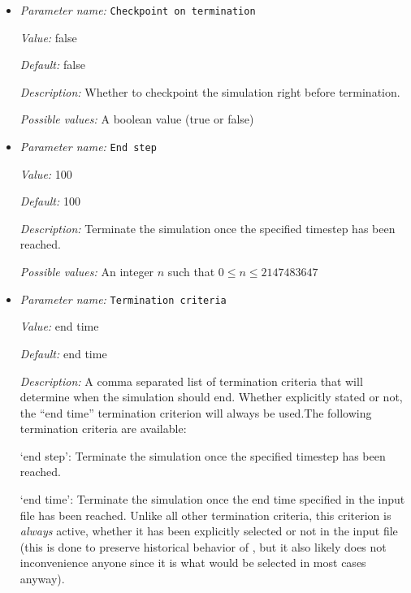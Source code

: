 \begin{itemize}
\item {\it Parameter name:} {\tt Checkpoint on termination}
\label{parameters:Termination criteria/Checkpoint on termination}


{\it Value:} false


{\it Default:} false


{\it Description:} Whether to checkpoint the simulation right before termination.


{\it Possible values:} A boolean value (true or false)
\item {\it Parameter name:} {\tt End step}
\label{parameters:Termination criteria/End step}


{\it Value:} 100


{\it Default:} 100


{\it Description:} Terminate the simulation once the specified timestep has been reached.


{\it Possible values:} An integer $n$ such that $0\leq n \leq 2147483647$
\item {\it Parameter name:} {\tt Termination criteria}
\label{parameters:Termination criteria/Termination criteria}


{\it Value:} end time


{\it Default:} end time


{\it Description:} A comma separated list of termination criteria that will determine when the simulation should end. Whether explicitly stated or not, the ``end time'' termination criterion will always be used.The following termination criteria are available:

`end step': Terminate the simulation once the specified timestep has been reached. 

`end time': Terminate the simulation once the end time specified in the input file has been reached. Unlike all other termination criteria, this criterion is \textit{always} active, whether it has been explicitly selected or not in the input file (this is done to preserve historical behavior of \aspect{}, but it also likely does not inconvenience anyone since it is what would be selected in most cases anyway).


\end{itemize}
